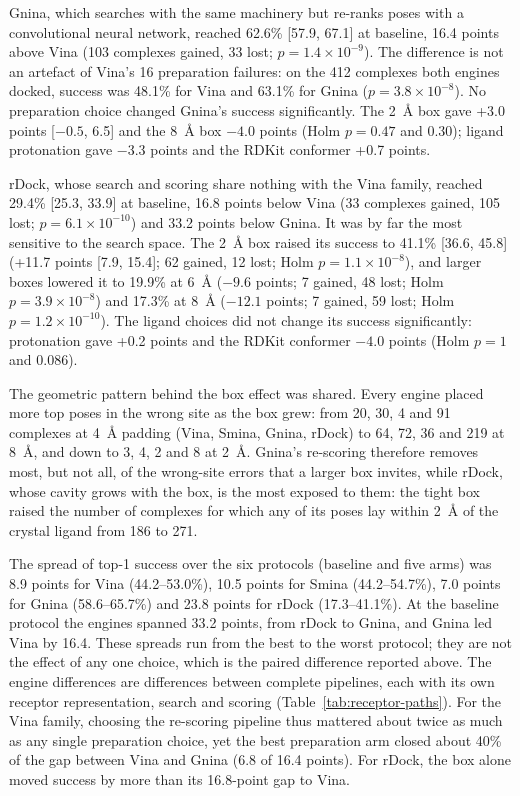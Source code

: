 Gnina, which searches with the same machinery but re-ranks poses with a convolutional
neural network, reached 62.6\% [57.9, 67.1] at baseline, 16.4 points above Vina (103
complexes gained, 33 lost; $p = 1.4 \times 10^{-9}$). The difference is not an artefact of
Vina's 16 preparation failures: on the 412 complexes both engines docked, success was
48.1\% for Vina and 63.1\% for Gnina ($p = 3.8 \times 10^{-8}$). No preparation choice
changed Gnina's success significantly. The \SI{2}{\angstrom} box gave +3.0 points [$-0.5$, 6.5] and the
\SI{8}{\angstrom} box $-4.0$ points (Holm $p = 0.47$ and $0.30$); ligand protonation gave
$-3.3$ points and the RDKit conformer +0.7 points.

rDock, whose search and scoring share nothing with the Vina family, reached 29.4\% [25.3,
33.9] at baseline, 16.8 points below Vina (33 complexes gained, 105 lost;
$p = 6.1 \times 10^{-10}$) and 33.2 points below Gnina. It was by far the most sensitive to
the search space. The \SI{2}{\angstrom} box raised its success to 41.1\% [36.6, 45.8]
(+11.7 points [7.9, 15.4]; 62 gained, 12 lost; Holm $p = 1.1 \times 10^{-8}$), and larger boxes lowered
it to 19.9\% at \SI{6}{\angstrom} ($-9.6$ points; 7 gained, 48 lost; Holm
$p = 3.9 \times 10^{-8}$) and 17.3\% at \SI{8}{\angstrom} ($-12.1$ points; 7 gained, 59
lost; Holm $p = 1.2 \times 10^{-10}$). The ligand choices did not change its success
significantly: protonation gave +0.2 points and the RDKit conformer $-4.0$ points (Holm
$p = 1$ and $0.086$).

The geometric pattern behind the box effect was shared. Every engine placed more top poses in
the wrong site as the box grew: from 20, 30, 4 and 91 complexes at \SI{4}{\angstrom}
padding (Vina, Smina, Gnina, rDock) to 64, 72, 36 and 219 at \SI{8}{\angstrom}, and down
to 3, 4, 2 and 8 at \SI{2}{\angstrom}. Gnina's re-scoring therefore removes most, but not
all, of the wrong-site errors that a larger box invites, while rDock, whose cavity grows
with the box, is the most exposed to them: the tight box raised the number of complexes for
which any of its poses lay within \SI{2}{\angstrom} of the crystal ligand from 186 to 271.

The spread of top-1 success over the six protocols (baseline and five arms) was 8.9 points for Vina
(44.2--53.0\%), 10.5 points for Smina (44.2--54.7\%), 7.0 points for Gnina
(58.6--65.7\%) and 23.8 points for rDock (17.3--41.1\%). At the baseline protocol the
engines spanned 33.2 points, from rDock to Gnina, and Gnina led Vina by 16.4. These spreads
run from the best to the worst protocol; they are not the effect of any one choice, which is
the paired difference reported above. The engine differences are differences between complete
pipelines, each with its own receptor representation, search and scoring
(Table~\ref{tab:receptor-paths}). For the Vina family, choosing the re-scoring pipeline
thus mattered about twice as much as any single preparation choice, yet the best preparation arm closed about 40\% of the gap between Vina
and Gnina (6.8 of 16.4 points). For rDock, the box alone moved success by more than its
16.8-point gap to Vina.

